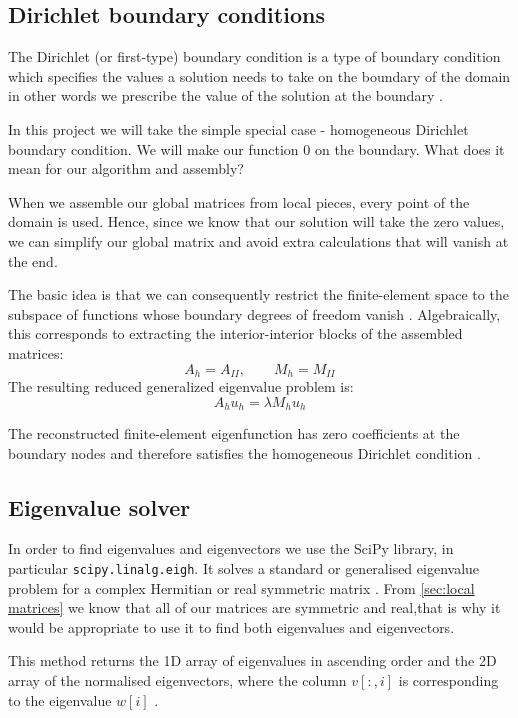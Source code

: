 \documentclass[conference]{IEEEtran}
\begin{document}
\subsection{Dirichlet boundary conditions}
The Dirichlet (or first-type) boundary condition is a type of boundary condition which specifies the values a solution needs to take on the boundary of the domain \cite{b21} in other words we prescribe the value of the solution at the boundary \cite{b10}.

In this project we will take the simple special case - homogeneous Dirichlet boundary condition. We will make our function $0$ on the boundary. What does it mean for our algorithm and assembly?

When we assemble our global matrices from local pieces, every point of the domain is used. Hence, since we know that our solution will take the zero values, we can simplify our global matrix and avoid extra calculations that will vanish at the end.

The basic idea is that we can consequently restrict the finite-element space to the subspace of functions whose boundary degrees of freedom vanish \cite{b22}. Algebraically, this corresponds to extracting the interior-interior blocks of the assembled matrices:
\begin{equation}
    A_h = A_{II},\qquad M_h=M_{II}
\end{equation}
The resulting reduced generalized eigenvalue problem is:
\begin{equation}
    A_h u_h = \lambda M_h u_h 
\end{equation}

The reconstructed finite-element eigenfunction has zero coefficients at the boundary nodes and therefore satisfies the homogeneous Dirichlet condition \cite{b22.1}.


\subsection{Eigenvalue solver}
In order to find eigenvalues and eigenvectors we use the SciPy library, in particular \texttt{scipy.linalg.eigh}. It solves a standard or generalised eigenvalue problem for a complex Hermitian or real symmetric matrix \cite{b23}. From \ref{sec:local matrices} we know that all of our matrices are symmetric and real,that is why it would be appropriate to use it to find both eigenvalues and eigenvectors.

This method returns the 1D array of eigenvalues in ascending order and the 2D array of the normalised eigenvectors, where the column $v[:, i]$ is corresponding to the eigenvalue $w[i]$ \cite{b23}.
\end{document}
